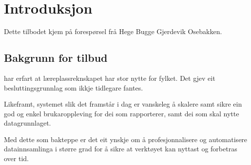 \section{Introduksjon}
Dette tilbodet kjem på forespørsel frå Hege Bugge Gjerdevik Osebakken.

\subsection{Bakgrunn for tilbud}
\customername har erfart at læreplassreknskapet har stor nytte for fylket. Det gjev eit besluttingsgrunnlag som ikkje tidlegare fantes.

Likeframt, systemet slik det framstår i dag er vanskeleg å skalere samt sikre ein god og enkel brukaroppleving for dei som rapporterer, samt dei som skal nytte datagrunnlaget. 

Med dette som bakteppe er det eit ynskje om å profesjonnalisere og automatisere datainnsamlinga i større grad for å sikre at verktøyet kan nyttast og forbetras over tid.